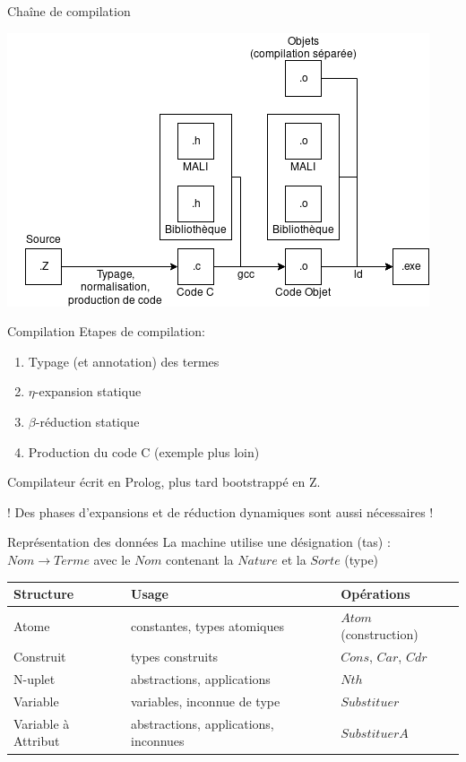 \documentclass[aspectratio=169]{beamer}
\begin{document}
\begin{frame}{Chaîne de compilation}
  \begin{center}
    \includegraphics[width=.5\paperwidth]{assets/mali-chain.png}
  \end{center}
\end{frame}

\begin{frame}{Compilation}
  Etapes de compilation:
  \begin{enumerate}
  \item Typage (et annotation) des termes
  \item $\eta$-expansion statique
  \item $\beta$-réduction statique
  \item Production du code C (exemple plus loin)
  \end{enumerate}
  Compilateur écrit en Prolog, plus tard bootstrappé en Z.

  ! Des phases d'expansions et de réduction dynamiques sont aussi nécessaires !
\end{frame}

\begin{frame}{Représentation des données}
  La machine utilise une désignation (tas) : $Nom \rightarrow Terme$
  avec le $Nom$ contenant la $Nature$ et la $Sorte$ (type)
  \begin{table}
  \begin{tabular}{l|l|l}
    Structure & Usage & Opérations\\
    \hline
    Atome & constantes, types atomiques & $Atom$ (construction) \\
    Construit & types construits & $Cons$, $Car$, $Cdr$\\
    N-uplet & abstractions, applications & $Nth$\\
    Variable & variables, inconnue de type & $Substituer$\\
    Variable à Attribut & abstractions, applications, inconnues & $SubstituerA$\\
    \hline
  \end{tabular}
  \end{table}
\end{frame}
\end{document}
